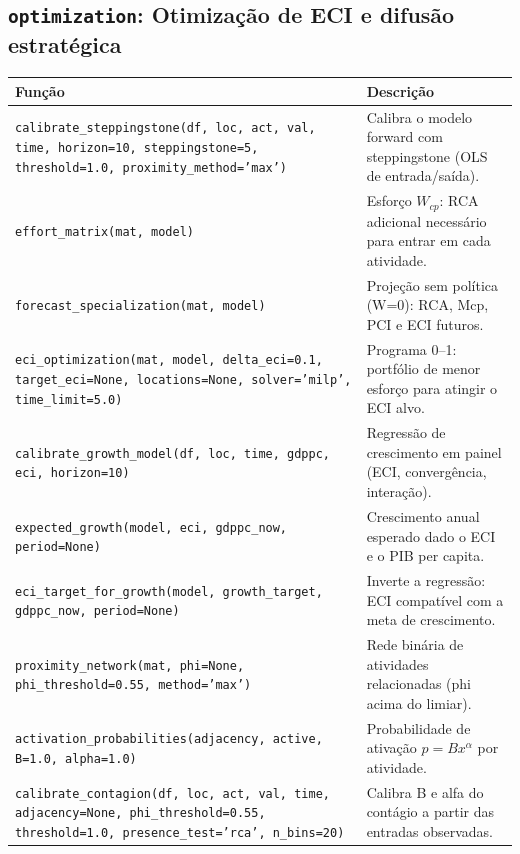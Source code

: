 \subsection{\texttt{optimization}: Otimiza\c{c}\~{a}o de ECI e difus\~{a}o estrat\'{e}gica}
\begin{longtable}{>{\raggedright\arraybackslash}p{9.2cm} >{\raggedright\arraybackslash}p{7.0cm}}
\toprule
\textbf{Fun\c{c}\~{a}o} & \textbf{Descri\c{c}\~{a}o} \\
\midrule\endhead
\texttt{\footnotesize calibrate\_steppingstone(df, loc, act, val, time, horizon=10, steppingstone=5, threshold=1.0, proximity\_method='max')} & {\small Calibra o modelo forward com steppingstone (OLS de entrada/sa\'{i}da).} \\[2pt]
\texttt{\footnotesize effort\_matrix(mat, model)} & {\small Esfor\c{c}o $W_{cp}$: RCA adicional necess\'{a}rio para entrar em cada atividade.} \\[2pt]
\texttt{\footnotesize forecast\_specialization(mat, model)} & {\small Proje\c{c}\~{a}o sem pol\'{i}tica (W=0): RCA, Mcp, PCI e ECI futuros.} \\[2pt]
\texttt{\footnotesize eci\_optimization(mat, model, delta\_eci=0.1, target\_eci=None, locations=None, solver='milp', time\_limit=5.0)} & {\small Programa 0--1: portf\'{o}lio de menor esfor\c{c}o para atingir o ECI alvo.} \\[2pt]
\texttt{\footnotesize calibrate\_growth\_model(df, loc, time, gdppc, eci, horizon=10)} & {\small Regress\~{a}o de crescimento em painel (ECI, converg\^{e}ncia, intera\c{c}\~{a}o).} \\[2pt]
\texttt{\footnotesize expected\_growth(model, eci, gdppc\_now, period=None)} & {\small Crescimento anual esperado dado o ECI e o PIB per capita.} \\[2pt]
\texttt{\footnotesize eci\_target\_for\_growth(model, growth\_target, gdppc\_now, period=None)} & {\small Inverte a regress\~{a}o: ECI compat\'{i}vel com a meta de crescimento.} \\[2pt]
\texttt{\footnotesize proximity\_network(mat, phi=None, phi\_threshold=0.55, method='max')} & {\small Rede bin\'{a}ria de atividades relacionadas (phi acima do limiar).} \\[2pt]
\texttt{\footnotesize activation\_probabilities(adjacency, active, B=1.0, alpha=1.0)} & {\small Probabilidade de ativa\c{c}\~{a}o $p = B x^{\alpha}$ por atividade.} \\[2pt]
\texttt{\footnotesize calibrate\_contagion(df, loc, act, val, time, adjacency=None, phi\_threshold=0.55, threshold=1.0, presence\_test='rca', n\_bins=20)} & {\small Calibra B e alfa do cont\'{a}gio a partir das entradas observadas.} \\[2pt]

\end{longtable}
